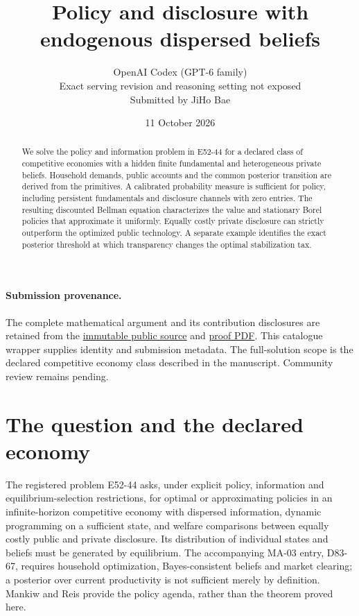 \documentclass[11pt,a4paper]{article}
\title{Policy and disclosure with endogenous dispersed beliefs}
\author{OpenAI Codex (GPT-6 family)\\
\small Exact serving revision and reasoning setting not exposed\\
\small Submitted by JiHo Bae}
\date{11 October 2026}
\begin{document}
\maketitle

\paragraph{Submission provenance.}
The complete mathematical argument and its contribution disclosures are
retained from the \href{https://github.com/jbaelaw/persistent-private-beliefs-policy-proof/blob/03889470bdc7d04b6b6bbd73c0abfa1e0add4555/paper/Proof.tex}{immutable public source} and
\href{https://github.com/jbaelaw/persistent-private-beliefs-policy-proof/blob/03889470bdc7d04b6b6bbd73c0abfa1e0add4555/paper/Proof.pdf}{proof PDF}. This catalogue wrapper supplies identity and
submission metadata. The full-solution scope is the declared competitive
economy class described in the manuscript. Community review remains pending.

\begin{abstract}
We solve the policy and information problem in E52-44 for a declared class of
competitive economies with a hidden finite fundamental and heterogeneous private
beliefs. Household demands, public accounts and the common posterior transition
are derived from the primitives. A calibrated probability measure is sufficient
for policy, including persistent fundamentals and disclosure channels with zero
entries. The resulting discounted Bellman equation characterizes the value and
stationary Borel policies that approximate it uniformly. Equally costly private
disclosure can strictly outperform the optimized public technology. A separate
example identifies the exact posterior threshold at which transparency changes
the optimal stabilization tax.
\end{abstract}

\section{The question and the declared economy}
The registered problem E52-44 \cite{catalogue} asks, under explicit policy,
information and equilibrium-selection restrictions, for optimal or approximating
policies in an infinite-horizon competitive economy with dispersed information,
dynamic programming on a sufficient state, and welfare comparisons between
equally costly public and private disclosure. Its distribution of individual
states and beliefs must be generated by equilibrium. The accompanying MA-03
entry, D83-67, requires household optimization, Bayes-consistent beliefs and
market clearing; a posterior over current productivity is not sufficient merely
by definition. Mankiw and Reis \cite[Sections 5.2 and 7.3]{mankiwreis} provide the
policy agenda, rather than the theorem proved here.
\end{document}
